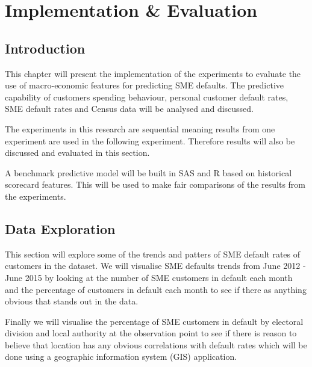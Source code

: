 
\chapter{Implementation \& Evaluation} %

\label{Chapter5} %


\section{Introduction}
This chapter will present the implementation of the experiments to evaluate the use of macro-economic features for predicting SME defaults. The predictive capability of customers spending behaviour, personal customer default rates, SME default rates and Census data  will be analysed and discussed.

The experiments in this research are sequential meaning results from one experiment are used in the following experiment. Therefore results will also be discussed and evaluated in this section.

A benchmark predictive model will be built in SAS and R based on historical scorecard features. This will be used to make fair comparisons of the results from the experiments.


\section{Data Exploration}\label{sec:Dataexplor}

This section will explore some of the trends and patters of SME default rates of customers in the dataset. We will visualise SME defaults trends from June 2012 - June 2015 by looking at the number of SME customers in default each month and the percentage of customers in default each month to see if there as anything obvious that stands out in the data. 

Finally we will visualise the percentage of SME customers in default by electoral division and local authority at the observation point to see if there is reason to believe that location has any obvious correlations with default rates which will be done using a geographic information system (GIS) application.

